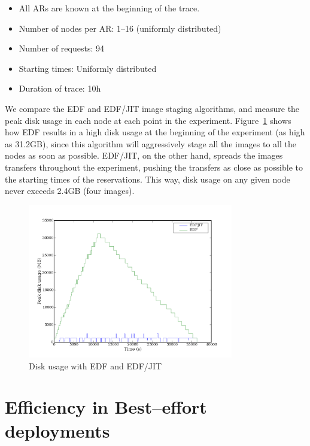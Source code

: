 \begin{itemize}
\item All ARs are known at the beginning of the trace.
\item Number of nodes per AR: 1--16 (uniformly distributed)
\item Number of requests: 94
\item Starting times: Uniformly distributed
\item Duration of trace: 10h
\end{itemize}

We compare the EDF and EDF/JIT image staging algorithms, and measure the peak disk usage in each node at each point in the experiment. Figure~\ref{fig:edfdiskusage} shows how EDF results in a high disk usage at the beginning of the experiment (as high as 31.2GB), since this algorithm will aggressively stage all the images to all the nodes as soon as possible. EDF/JIT, on the other hand, spreads the images transfers throughout the experiment, pushing the transfers as close as possible to the starting times of the reservations. This way, disk usage on any given node never exceeds 2.4GB (four images).

\begin{figure}
  \begin{center}
    \includegraphics[width=0.8\textwidth]{figures/ar_edf.png}
    \caption{Disk usage with EDF and EDF/JIT}
	\label{fig:edfdiskusage}
  \end{center}
\end{figure}

\section{Efficiency in Best--effort deployments}

